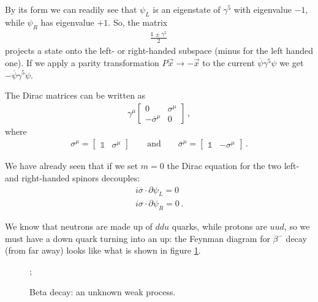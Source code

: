 \documentclass[main.tex]{subfiles}
\begin{document}
By its form we can readily see that \(\psi_{L}\) is an eigenstate of \(\gamma^{5}\) with eigenvalue \(-1\), while \(\psi_{R}\) has eigenvalue \(+1\). 
So, the matrix 
%
\begin{align}
\frac{\mathbb{1} \pm \gamma^{5}}{2} 
\,
\end{align}
%
projects a state onto the left- or right-handed subspace (minus for the left handed one).
If we apply a parity transformation \(P \vec{x} \to - \vec{x}\) to the current \(\overline{\psi} \gamma^{5} \psi \) we get \(- \overline{\psi} \gamma^{5} \psi \). 

The Dirac matrices can be written as 
%
\begin{subequations}
\begin{align}
\gamma^{\mu } \left[\begin{array}{cc}
0 & \sigma^{\mu }  \\ 
-\overline{\sigma}^{\mu } & 0
\end{array}\right]
\,,
\end{align}
\end{subequations}
%
where 
%
\begin{align}
\sigma^{\mu } = \left[\begin{array}{cc}
\mathbb{1} & \sigma^{\mu }
\end{array}\right]
\qquad \text{and} \qquad
\overline{\sigma}^{\mu } = \left[\begin{array}{cc}
\mathbb{1} & - \sigma^{\mu }
\end{array}\right]
\,.
\end{align}
%

We have already seen that if we set \(m=0\) the Dirac equation for the two left- and right-handed spinors decouples:
%
\begin{subequations}
\begin{align}
i \overline{\sigma} \cdot \partial \psi_{L} =0\\
i \sigma \cdot \partial \psi_{R}=0
\,.
\end{align}
\end{subequations}

We know that neutrons are made up of \(ddu\) quarks, while protons are \(uud\), so we must have a down quark turning into an up:
the Feynman diagram for \(\beta^{-}\) decay (from far away) looks like what is shown in figure \ref{fig:beta-decay}.

\begin{figure}[ht]
\centering
{};
\caption{Beta decay: an unknown weak process.}
\label{fig:beta-decay}
\end{figure}
\end{document}
